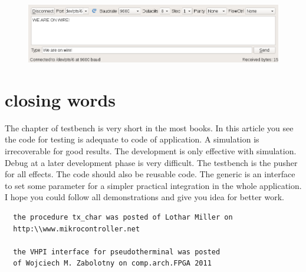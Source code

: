 \documentclass[a4paper,11pt]{article}
\begin{document}
\begin{figure}[H]
  \begin{center}
    \includegraphics[scale=0.5]{vhpi/terminal.png}
  \end{center}
\end{figure}

\section{closing words}
 The chapter of testbench is very short in the most books. In this article you see the code for testing is adequate to code of application. A simulation is irrecoverable for good results. The development is only effective with simulation. Debug at a later development phase is very difficult. The testbench is the pusher for all effects. The code should also be reusable code. The generic is an interface to set some parameter for a simpler practical integration in the whole application. I hope you could follow all demonstrations and give you idea for better work. 
 
 \begin{verbatim}
  the procedure tx_char was posted of Lothar Miller on
  http:\\www.mikrocontroller.net
  
  the VHPI interface for pseudotherminal was posted 
  of Wojciech M. Zabolotny on comp.arch.FPGA 2011
 \end{verbatim} 
\end{document}
